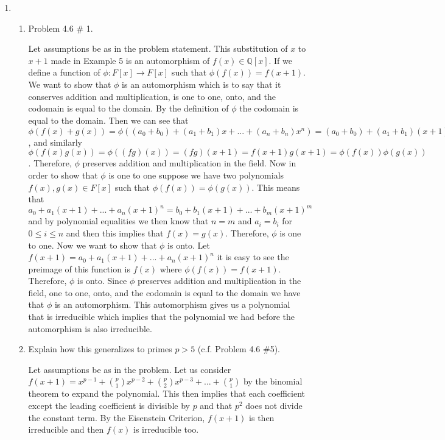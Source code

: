 \documentclass[11pt]{article}
\newcommand{\Q}{\mathbb{Q}}
\begin{document}
\begin{enumerate}

\item \begin{enumerate}
\item Problem 4.6 \# 1.

Let assumptions be as in the problem statement. This substitution of $x$ to $x+1$ made in Example 5 is an automorphism of $f(x)\in \Q[x]$. If we define a function of $\phi: F[x]\rightarrow F[x]$ such that $\phi(f(x))=f(x+1)$. We want to show that $\phi$ is an automorphism which is to say that it conserves addition and multiplication, is one to one, onto, and the codomain is equal to the domain. By the definition of $\phi$ the codomain is equal to the domain. Then we can see that $\phi(f(x)+g(x)) = \phi((a_0+b_0)+(a_1+b_1)x+...+(a_n+b_n)x^n) = (a_0+b_0)+(a_1+b_1)(x+1)+...+(a_n+b_n)(x+1)^n = a_0+a_1(x+1)+...+a_n(x+1)^n+b_0+b_1(x+1)+...+b_n(x+1)^n = \phi(f(x))+\phi(g(x))$, and similarly $\phi(f(x)g(x)) = \phi((fg)(x)) = (fg)(x+1) = f(x+1)g(x+1) = \phi(f(x))\phi(g(x))$. Therefore, $\phi$ preserves addition and multiplication in the field. Now in order to show that $\phi$ is one to one suppose we have two polynomials $f(x), g(x) \in F[x]$ such that $\phi(f(x)) = \phi(g(x))$. This means that $a_0+a_1(x+1)+...+a_n(x+1)^n = b_0+b_1(x+1)+...+b_m(x+1)^m$ and by polynomial equalities we then know that $n=m$ and $a_i=b_i$ for $0\leq i\leq n$ and then this implies that $f(x) = g(x).$ Therefore, $\phi$ is one to one. Now we want to show that $\phi$ is onto. Let $f(x+1) = a_0+a_1(x+1)+...+a_n(x+1)^n$ it is easy to see the preimage of this function is $f(x)$ where $\phi(f(x)) = f(x+1)$. Therefore, $\phi$ is onto. Since $\phi$ preserves addition and multiplication in the field, one to one, onto, and the codomain is equal to the domain we have that $\phi$ is an automorphism. This automorphism gives us a polynomial that is irreducible which implies that the polynomial we had before the automorphism is also irreducible. 

\item Explain how this generalizes to primes $p > 5$ (c.f. Problem 4.6 \#5).

Let assumptions be as in the problem. Let us consider $f(x+1) = x^{p-1}+\binom{p}{1}x^{p-2}+\binom{p}{2}x^{p-3}+...+\binom{p}{1}$ by the binomial theorem to expand the polynomial. This then implies that each coefficient except the leading coefficient is divisible by $p$ and that $p^2$ does not divide the constant term. By the Eisenstein Criterion, $f(x+1)$ is then irreducible and then $f(x)$ is irreducible too.


\end{enumerate}
\end{enumerate}
\end{document}
